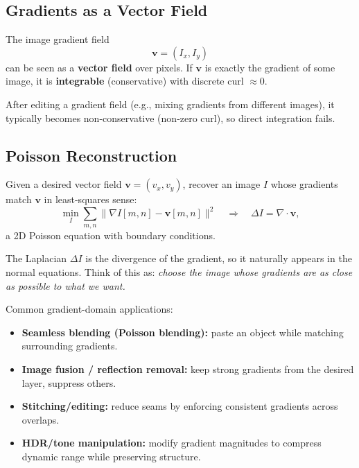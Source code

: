 \documentclass[11pt, oneside]{book}
\newcommand{\vct}[1]{\bm{#1}}           %
\begin{document}
\begin{thmbox}[title={Reprojection Error Minimization}]
\begin{defbox}[title={Correlation and Convolution}]
\subsection{Gradients as a Vector Field}

\begin{defbox}[title={Gradient Field}]
The image gradient field
\[
\vct{v} = (I_x, I_y)
\]
can be seen as a \textbf{vector field} over pixels.
If $\vct{v}$ is exactly the gradient of some image, it is \textbf{integrable} (conservative) with discrete curl $\approx 0$.
\end{defbox}

After editing a gradient field (e.g., mixing gradients from different images), it typically becomes non-conservative
(non-zero curl), so direct integration fails.

\subsection{Poisson Reconstruction}

\begin{thmbox}[title={Poisson Reconstruction}]
Given a desired vector field $\vct{v}=(v_x,v_y)$, recover an image $I$ whose gradients match $\vct{v}$
in least-squares sense:
\[
\min_I \sum_{m,n} \|\nabla I[m,n] - \vct{v}[m,n]\|^2
\quad\Longrightarrow\quad
\Delta I = \nabla\cdot \vct{v},
\]
a 2D Poisson equation with boundary conditions.
\end{thmbox}

The Laplacian $\Delta I$ is the divergence of the gradient, so it naturally appears in the normal equations.
Think of this as: \emph{choose the image whose gradients are as close as possible to what we want.}

Common gradient-domain applications:
\begin{itemize}
  \item \textbf{Seamless blending (Poisson blending):} paste an object while matching surrounding gradients.
  \item \textbf{Image fusion / reflection removal:} keep strong gradients from the desired layer, suppress others.
  \item \textbf{Stitching/editing:} reduce seams by enforcing consistent gradients across overlaps.
  \item \textbf{HDR/tone manipulation:} modify gradient magnitudes to compress dynamic range while preserving structure.
\end{itemize}


\end{defbox}
\end{thmbox}
\end{document}

